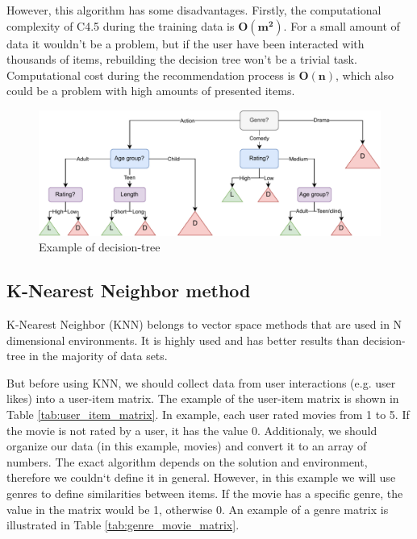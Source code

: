 However, this algorithm has some disadvantages. Firstly, the computational complexity of C4.5 during the training data is $\mathbf{O(m^2)}$. For a small amount of data it wouldn't be a problem, but if the user have been interacted with thousands of items, rebuilding the decision tree won't be a trivial task. Computational cost during the recommendation process is $\mathbf{O(n)}$, which also could be a problem with high amounts of presented items\cite{Decision_Tree}.
\begin{center}
    \begin{figure}[H]
    \includegraphics[width=\textwidth]{figures/diagrams/article_decision_tree_colored.pdf}
    \caption{Example of decision-tree}
    \label{fig:decision_tree}
    \end{figure}
\end{center}

\subsection{K-Nearest Neighbor method}
K-Nearest Neighbor (KNN) belongs to vector space methods that are used in N dimensional environments. It is highly used and has better results than decision-tree in the majority of data sets\cite{KNN}.

But before using KNN, we should collect data from user interactions (e.g. user likes) into a user-item matrix. The example of the user-item matrix is shown in Table \ref{tab:user_item_matrix}. In example, each user rated movies from 1 to 5. If the movie is not rated by a user, it has the value 0. Additionaly, we should organize our data (in this example, movies) and convert it to an array of numbers. The exact  algorithm depends on the solution and environment, therefore we couldn`t define it in general. However, in this example we will use genres to define similarities between items. If the movie has a specific genre, the value in the matrix would be 1, otherwise 0. An example of a genre matrix is illustrated in Table \ref{tab:genre_movie_matrix}.

